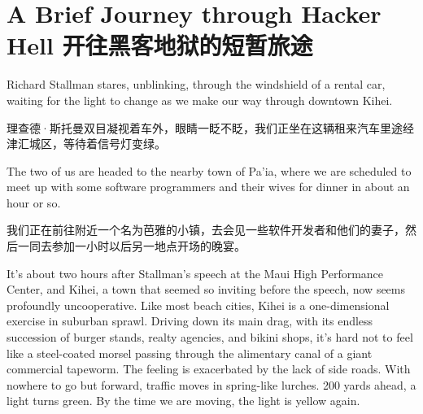 

\chapter{\ifdefined\eng
A Brief Journey through Hacker Hell
\fi
\ifdefined\chs
开往黑客地狱的短暂旅途
\fi
}




\ifdefined\eng
Richard Stallman stares, unblinking, through the windshield of a rental car, waiting for the light to change as we make our way through downtown Kihei.
\fi

\ifdefined\chs
理查德·斯托曼双目凝视着车外，眼睛一眨不眨，我们正坐在这辆租来汽车里途经津汇城区，等待着信号灯变绿。
\fi

\ifdefined\eng
The two of us are headed to the nearby town of Pa'ia, where we are scheduled to meet up with some software programmers and their wives for dinner in about an hour or so.
\fi

\ifdefined\chs
我们正在前往附近一个名为芭雅的小镇，去会见一些软件开发者和他们的妻子，然后一同去参加一小时以后另一地点开场的晚宴。
\fi

\ifdefined\eng
It's about two hours after Stallman's speech at the Maui High Performance Center, and Kihei, a town that seemed so inviting before the speech, now seems profoundly uncooperative. Like most beach cities, Kihei is a one-dimensional exercise in suburban sprawl. Driving down its main drag, with its endless succession of burger stands, realty agencies, and bikini shops, it's hard not to feel like a steel-coated morsel passing through the alimentary canal of a giant commercial tapeworm. The feeling is exacerbated by the lack of side roads. With nowhere to go but forward, traffic moves in spring-like lurches. 200 yards ahead, a light turns green. By the time we are moving, the light is yellow again.
\fi

